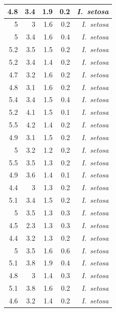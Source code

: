 \begin{enumerate}
\begin{center}
\begin{longtable}{|r|r|r|r|r|}
				\hline
				4.8   & 3.4   & 1.9   & 0.2   & \textit{I. setosa} \\
				\hline
				5     & 3     & 1.6   & 0.2   & \textit{I. setosa} \\
				\hline
				5     & 3.4   & 1.6   & 0.4   & \textit{I. setosa} \\
				\hline
				5.2   & 3.5   & 1.5   & 0.2   & \textit{I. setosa} \\
				\hline
				5.2   & 3.4   & 1.4   & 0.2   & \textit{I. setosa} \\
				\hline
				4.7   & 3.2   & 1.6   & 0.2   & \textit{I. setosa} \\
				\hline
				4.8   & 3.1   & 1.6   & 0.2   & \textit{I. setosa} \\
				\hline
				5.4   & 3.4   & 1.5   & 0.4   & \textit{I. setosa} \\
				\hline
				5.2   & 4.1   & 1.5   & 0.1   & \textit{I. setosa} \\
				\hline
				5.5   & 4.2   & 1.4   & 0.2   & \textit{I. setosa} \\
				\hline
				4.9   & 3.1   & 1.5   & 0.2   & \textit{I. setosa} \\
				\hline
				5     & 3.2   & 1.2   & 0.2   & \textit{I. setosa} \\
				\hline
				5.5   & 3.5   & 1.3   & 0.2   & \textit{I. setosa} \\
				\hline
				4.9   & 3.6   & 1.4   & 0.1   & \textit{I. setosa} \\
				\hline
				4.4   & 3     & 1.3   & 0.2   & \textit{I. setosa} \\
				\hline
				5.1   & 3.4   & 1.5   & 0.2   & \textit{I. setosa} \\
				\hline
				5     & 3.5   & 1.3   & 0.3   & \textit{I. setosa} \\
				\hline
				4.5   & 2.3   & 1.3   & 0.3   & \textit{I. setosa} \\
				\hline
				4.4   & 3.2   & 1.3   & 0.2   & \textit{I. setosa} \\
				\hline
				5     & 3.5   & 1.6   & 0.6   & \textit{I. setosa} \\
				\hline
				5.1   & 3.8   & 1.9   & 0.4   & \textit{I. setosa} \\
				\hline
				4.8   & 3     & 1.4   & 0.3   & \textit{I. setosa} \\
				\hline
				5.1   & 3.8   & 1.6   & 0.2   & \textit{I. setosa} \\
				\hline
				4.6   & 3.2   & 1.4   & 0.2   & \textit{I. setosa} \\

\end{longtable}
\end{center}
\end{enumerate}
